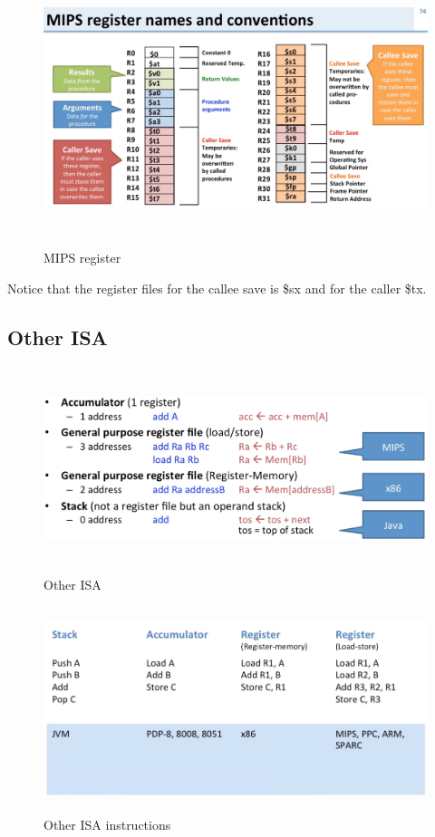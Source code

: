 \begin{figure}[h]
    \vspace{10mm}
    \centering
    \includegraphics[width=16cm, height=8cm]{image/mips-register.png} 
    \caption{MIPS register}
\end{figure}

Notice that the register files for the callee save is \$sx and for the caller \$tx.

\newpage
\subsection{Other ISA}
\begin{figure}[h]
    \vspace{10mm}
    \centering
    \includegraphics[width=16cm, height=6cm]{image/other-isa.png} 
    \caption{Other ISA}
\end{figure}

\newpage

\begin{figure}[h]
    \vspace{10mm}
    \centering
    \includegraphics[width=16cm, height=6cm]{image/other-isa-instructions.png} 
    \caption{Other ISA instructions}
\end{figure}


